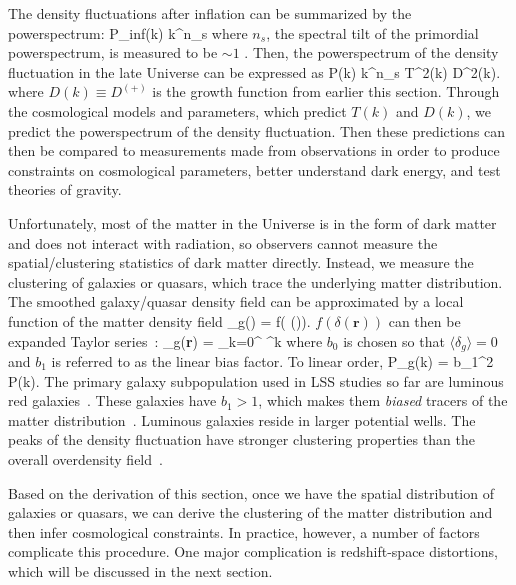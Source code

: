 The density fluctuations after inflation can be summarized by the powerspectrum: 
\beq
P_{\rm inf}(k) \propto k^{n_s}
\eeq
where $n_s$, the spectral tilt of the primordial powerspectrum, is measured to be 
$\sim 1$ \citep{Harrison:1970aa, Peebles:1970, Zeldovich:1972, Komatsu:2011aa}.
Then, the powerspectrum of the density fluctuation in the late Universe can be 
expressed as 
\beq
P(k) \propto k^{n_s} \; T^2(k) \; D^2(k).
\eeq
where $D(k) \equiv D^{(+)}$ is the growth function from earlier this section. 
Through the cosmological models and parameters, which predict 
$T(k)$ and $D(k)$, we predict the powerspectrum of the density fluctuation. Then 
these predictions can then be compared to measurements made from observations in 
order to produce constraints on cosmological parameters, better understand dark 
energy, and test theories of gravity. 

Unfortunately, most of the matter in the Universe is in the form of dark 
matter and does not interact with radiation, so observers cannot measure the 
spatial/clustering statistics of dark matter directly. 
Instead, we measure the clustering of galaxies or quasars, which trace
the underlying matter distribution. The smoothed galaxy/quasar density field 
can be  approximated by a local function of the matter density field
\beq
\delta_g() = f( \delta()). 
\eeq
$f(\delta(\bm{r}))$ can then be expanded Taylor series~\citep{Fry:1993}:
\beq
\delta_g({\bf r}) = \sum\limits_{k=0}^{\infty}  \delta^k 
\eeq
where $b_0$ is chosen so that $\langle \delta_g \rangle = 0$ and $b_1$ is referred to as 
the linear bias factor. To linear order, 
\beq
P_g(k) = b_1^2 P(k). 
\eeq
The primary galaxy subpopulation used in LSS studies so far are luminous 
red galaxies~\citep{Eisenstein:2001aa, Dawson:2013aa}. These galaxies have $b_1 > 1$,
which makes them {\em biased} tracers of the matter 
distribution~\citep{Zehavi:2005aa, Sheldon:2009aa,Gaztanaga:2009aa, Zhai:2016aa}.
Luminous galaxies reside in larger potential wells. The peaks of the density fluctuation
have stronger clustering properties than the overall overdensity field~\citep{Manera:2010aa}.

Based on the derivation of this section, once we have the spatial 
distribution of galaxies or quasars, we can derive the clustering of the matter
distribution and then infer cosmological constraints. In practice, however, a
number of factors complicate this procedure. One major complication is redshift-space
distortions, which will be discussed in the next section.

